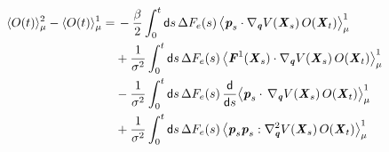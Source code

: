 \documentclass[aip,jcp,a4paper,reprint,onecolumn]{revtex4-1}
\newcommand{\vect}[1]{\textbf{\textit{#1}}}
\newcommand{\dd}{\textsf{d}}
\begin{document}
\begin{align}\nonumber
  \langle O(t)\rangle_{\mu}^{2}  -\langle O(t)\rangle_{\mu}^{1}
  =&\,
  -\frac\beta 2
  \int_0^t\dd s\,
  \Delta F_e(s)\,
  \big\langle
  \vect p_s\cdot\nabla_{\vect q} V(\vect X_s)\,O(\vect X_t)
  \big\rangle_\mu^1 \\\nonumber
  & +
  \frac1{\sigma^2}
  \int_0^t\dd s\,
  \Delta F_e(s)\,
  \big\langle
  \vect F^1(\vect X_s)
  \cdot\nabla_{\vect q} V(\vect X_s)
  \,O(\vect X_t)
  \big\rangle_\mu^1 \\\nonumber
  & -
  \frac1{\sigma^2}
  \int_0^t
  \dd s\,
  \Delta F_e(s)\,
  \frac{\dd}{\dd s}
  \big\langle
  \vect p_s\cdot\,
  \nabla_{\vect q} V(\vect X_s)
  \,O(\vect X_t)
  \big\rangle_\mu^1    \\\label{eqn:noneq-pert-3}
  & +
  \frac1{\sigma^2}
  \int_0^t
  \dd s\,
  \Delta F_e(s)\,
  \big\langle
  \vect p_s\vect p_s:
  \nabla^2_{\vect q} V(\vect X_s)
  \,O(\vect X_t)
  \big\rangle_\mu^1      
\end{align}
\end{document}
